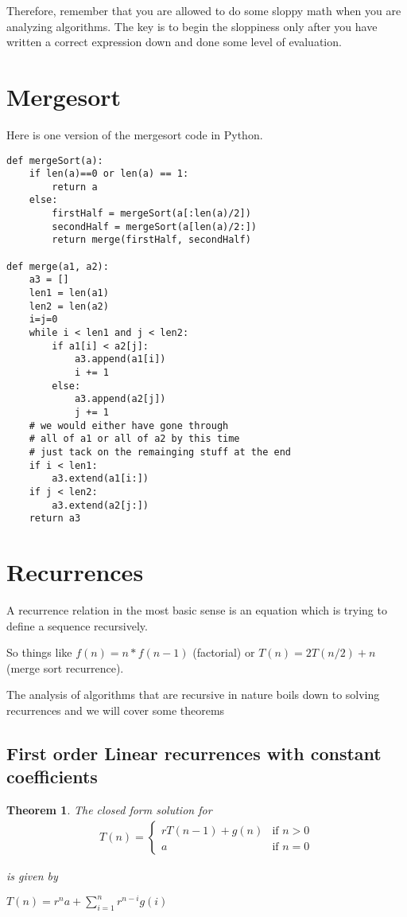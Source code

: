 \documentclass[12pt]{article}
\newtheorem{theorem}{Theorem}
\begin{document}
Therefore, remember that you are allowed to do some sloppy math when you are analyzing algorithms. The key is to begin the sloppiness only after you have written a correct expression down and done some level of evaluation.


\section*{Mergesort}

Here is one version of the mergesort code in Python. 

\begin{verbatim}
def mergeSort(a):
    if len(a)==0 or len(a) == 1:
        return a
    else:
        firstHalf = mergeSort(a[:len(a)/2])
        secondHalf = mergeSort(a[len(a)/2:])
        return merge(firstHalf, secondHalf)

def merge(a1, a2):
    a3 = []
    len1 = len(a1)
    len2 = len(a2)
    i=j=0
    while i < len1 and j < len2:
        if a1[i] < a2[j]:
            a3.append(a1[i])
            i += 1
        else:
            a3.append(a2[j])
            j += 1
    # we would either have gone through
    # all of a1 or all of a2 by this time
    # just tack on the remainging stuff at the end
    if i < len1:
        a3.extend(a1[i:])
    if j < len2:
        a3.extend(a2[j:])
    return a3
\end{verbatim}

\section*{Recurrences}

A recurrence relation in the most basic sense is an equation which is trying to define a sequence recursively.

So things like $f(n) = n * f(n-1)$ (factorial) or $T(n) = 2T(n/2) + n$ (merge sort recurrence). 

The analysis of algorithms that are recursive in nature boils down to solving recurrences and we will cover some theorems

\subsection*{First order Linear recurrences with constant coefficients}

\begin{theorem}
The closed form solution for
\begin{align*}
T(n) = \begin{cases}
rT(n-1) + g(n) & \mbox{if } n > 0\\
a & \mbox{if } n = 0
\end{cases}
\end{align*}

is given by

$T(n) = r^n a + \sum_{i=1}^n r^{n-i} g(i)$

\end{theorem}
\end{document}
